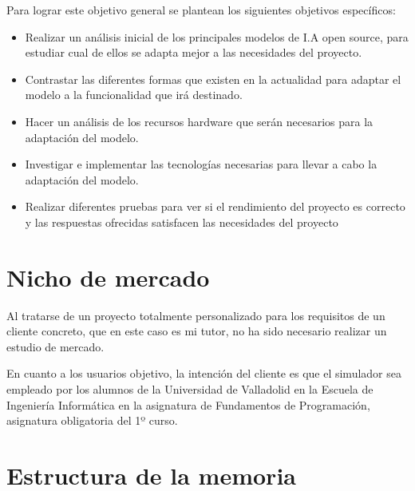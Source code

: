 Para lograr este objetivo general se plantean los siguientes objetivos específicos:

\begin{itemize}
    \item Realizar un análisis inicial de los principales modelos de I.A open source, para estudiar cual de ellos se adapta mejor a las necesidades del proyecto.
    \item Contrastar las diferentes formas que existen en la actualidad para adaptar el modelo a la funcionalidad que irá destinado.
    \item Hacer un análisis de los recursos hardware que serán necesarios para la adaptación del modelo.
    \item Investigar e implementar las tecnologías necesarias para llevar a cabo la adaptación del modelo.
    \item Realizar diferentes pruebas para ver si el rendimiento del proyecto es correcto y las respuestas ofrecidas satisfacen las necesidades del proyecto
\end{itemize}

\section{Nicho de mercado}

Al tratarse de un proyecto totalmente personalizado para los requisitos de un cliente concreto, que en este caso es mi tutor, no ha sido necesario realizar un estudio de mercado.

En cuanto a los usuarios objetivo, la intención del cliente es que el simulador sea empleado por los alumnos de la Universidad de Valladolid en la Escuela de Ingeniería Informática en la asignatura de Fundamentos de Programación, asignatura obligatoria del 1º curso. 

\section{Estructura de la memoria}

